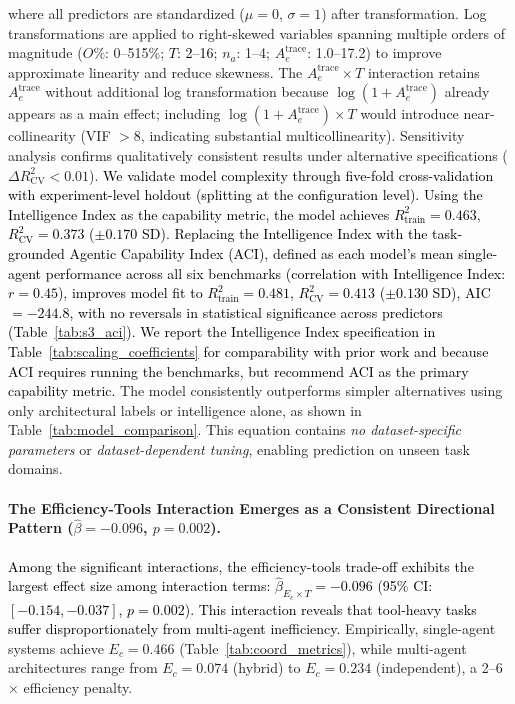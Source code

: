 where all predictors are standardized ($\mu=0$, $\sigma=1$) after transformation. Log transformations are applied to right-skewed variables spanning multiple orders of magnitude ($O\%$: 0--515\%; \textcolor{black}{$T$: 2--16}; $n_a$: 1--4; $A_e^{\text{trace}}$: 1.0--17.2) to improve approximate linearity and reduce skewness. The $A_e^{\text{trace}} \times T$ interaction retains $A_e^{\text{trace}}$ without additional log transformation because $\log(1+A_e^{\text{trace}})$ already appears as a main effect; including $\log(1+A_e^{\text{trace}}) \times T$ would introduce near-collinearity (VIF $> 8$, indicating substantial multicollinearity). Sensitivity analysis confirms qualitatively consistent results under alternative specifications ($\Delta R^2_{\text{CV}} < 0.01$). \textcolor{black}{We validate model complexity through five-fold cross-validation with experiment-level holdout (splitting at the configuration level). Using the Intelligence Index as the capability metric, the model achieves $R^2_{\text{train}} = 0.463$, $R^2_{\text{CV}} = 0.373$ ($\pm 0.170$ SD). Replacing the Intelligence Index with the task-grounded Agentic Capability Index (ACI), defined as each model's mean single-agent performance across all six benchmarks (correlation with Intelligence Index: $r=0.45$), improves model fit to $R^2_{\text{train}} = 0.481$, $R^2_{\text{CV}} = 0.413$ ($\pm 0.130$ SD), AIC $= -244.8$, with no reversals in statistical significance across predictors  (Table~\ref{tab:s3_aci}). We report the Intelligence Index specification in Table~\ref{tab:scaling_coefficients} for comparability with prior work and because ACI requires running the benchmarks, but recommend ACI as the primary capability metric.} The model consistently outperforms simpler alternatives using only architectural labels or intelligence alone, as shown in Table~\ref{tab:model_comparison}. This equation contains \textit{no dataset-specific parameters} or \textit{dataset-dependent tuning}, enabling prediction on unseen task domains.

\paragraph{The Efficiency-Tools Interaction Emerges as a Consistent Directional Pattern ($\hat{\beta} = -0.096$, $p = 0.002$).}
\textcolor{black}{Among the significant interactions, the efficiency-tools trade-off exhibits the largest effect size among interaction terms: $\hat{\beta}_{E_c \times T} = -0.096$ (95\% CI: $[-0.154, -0.037]$, $p = 0.002$). This interaction reveals that tool-heavy tasks suffer disproportionately from multi-agent inefficiency.} Empirically, single-agent systems achieve $E_c = 0.466$ (Table~\ref{tab:coord_metrics}), while multi-agent architectures range from $E_c = 0.074$ (hybrid) to $E_c = 0.234$ (independent), a 2--6$\times$ efficiency penalty. 


